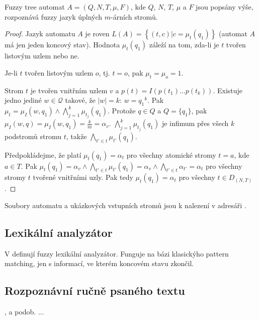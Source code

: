 \documentclass[a4paper,10pt]{article}
\begin{document}
\begin{theorem}
 Fuzzy tree automat $A = (Q, N, T, \mu, F)$, kde $Q$, $N$, $T$, $\mu$ a $F$ jsou popsány výše, rozpoznává fuzzy jazyk úplných $m$-árních stromů.
\end{theorem}
\begin{proof}
 Jazyk automatu $A$ je roven $L(A) = \left\{ (t, c) | c = \mu_t(q_1) \right\}$ (automat $A$ má jen jeden koncový stav). Hodnota $\mu_t(q_1)$ záleží na tom, zda-li je $t$ tvořen listovým uzlem nebo ne.

 Je-li $t$ tvořen listovým uzlem $o$, tj. $t = o$, pak $\mu_t = \mu_o = 1$.
  
 Strom $t$ je tvořen vnitřním uzlem $v$ a $p(t) = I(p(t_1) \dots p(t_k))$. Existuje jedno jediné $w \in \mathcal{Q}$ takové, že $|w| = k$: $w = {q_1}^k$. Pak $\mu_t = \mu_I(w, q_1) \wedge \bigwedge_{j=1}^{k} \mu_{t_j}(q_1)$. Protože $q \in Q$ a $Q = \{ q_1 \}$, pak $\mu_I(w, q) = \mu_I(w, q_1) = \frac{k}{m} = \alpha_v$. $\bigwedge_{j = 1}^{k} \mu_{t_j}(q_1)$ je infimum přes všech $k$ podstromů stromu $t$, takže $\bigwedge_{t' \in t} \mu_{t'}(q_1)$.
  
 Předpokládejme, že platí $\mu_t(q_1) = \alpha_t$ pro všechny atomické stromy $t = a$, kde $a \in T$. Pak $\mu_t(q_1) = \alpha_v \wedge \bigwedge_{t' \in t} \mu_{t'}(q_1) = \alpha_v \wedge \bigwedge_{t' \in t} \alpha_{t'} = \alpha_t$ pro všechny stromy $t$ tvořené vnitřními uzly. Pak tedy $\mu_t(q_1) = \alpha_t$ pro všechny $t \in D_{(N, T)}$.
\end{proof}

Soubory automatu a ukázkových vstupních stromů jsou k nalezení v adresáři .


\subsection{Lexikální analyzátor}


V \cite{MatSalSalYu-LexAnaSimFinFuzAutMod} definují fuzzy lexikální analyzátor. Funguje na bázi klasickýho pattern matching, jen s informací, ve kterém koncovém stavu zkončil.


\subsection{Rozpoznávní ručně psaného textu}
\cite{AstGariGonVillFar-ApprStrMatUsiDefFuzzAutLearExpr}, \cite{WeeFu-FormFuzAutAppModLeaSys} a podob.
...
\end{document}
